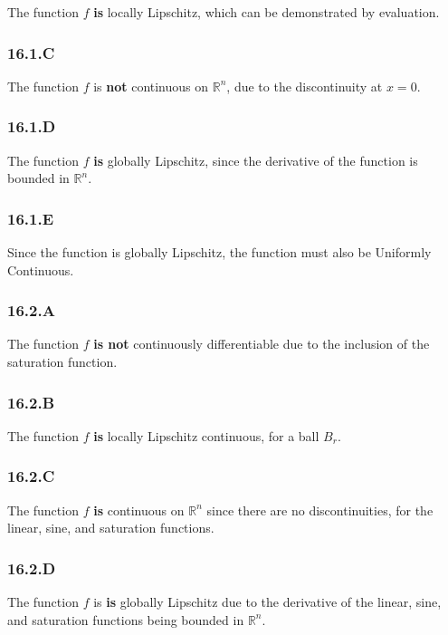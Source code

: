 \documentclass[12px]{article}
\newcommand{\R}{\mathbb{R}}
\begin{document}
The function $f$ \textbf{is} locally Lipschitz, which can be demonstrated by evaluation.
\subsubsection*{16.1.C}

The function $f$ is \textbf{not} continuous on $\R^n$, due to the discontinuity at $x =0$.
\subsubsection*{16.1.D}

The function $f$ \textbf{is} globally Lipschitz, since the derivative of the function is bounded in $\R^n$.
\subsubsection*{16.1.E}

Since the function is globally Lipschitz, the function must also be Uniformly Continuous.

\subsubsection*{16.2.A}

The function $f$ \textbf{is not} continuously differentiable due to the inclusion of the saturation function.

\subsubsection*{16.2.B}

The function $f$ \textbf{is} locally Lipschitz continuous, for a ball $B_r$.

\subsubsection*{16.2.C}

The function $f$ \textbf{is} continuous on $\R^n$ since there are no discontinuities, for the linear, sine, and saturation functions.

\subsubsection*{16.2.D}

The function $f$ is \textbf{is} globally Lipschitz due to the derivative of the linear, sine, and saturation functions being bounded in $\R^n$.
\end{document}
